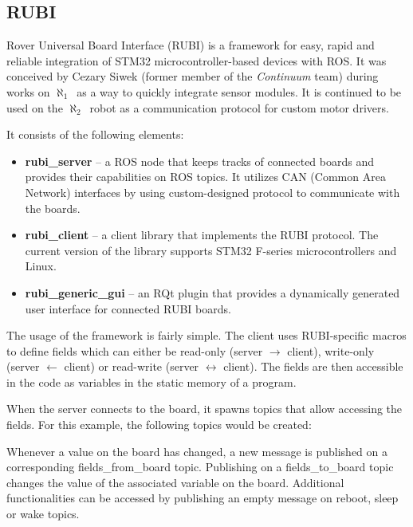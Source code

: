 \documentclass[english,inz,shortabstract]{iithesis}
\newcommand{\oldrovername}{$\aleph_1$\ }
\newcommand{\rovername}{$\aleph_2$\ }
\begin{document}
    \subsection{RUBI}
    Rover Universal Board Interface (RUBI) is a framework for easy, rapid and reliable integration of STM32 microcontroller-based devices with ROS. It was conceived by Cezary Siwek (former member of the \textit{Continuum} team) during works on \oldrovername as a way to quickly integrate sensor modules. It is continued to be used on the \rovername robot as a communication protocol for custom motor drivers.

    It consists of the following elements:
    \begin{itemize}
        \item \textbf{rubi\_server} -- a ROS node that keeps tracks of connected boards and provides their capabilities on ROS topics. It utilizes CAN (Common Area Network) interfaces by using custom-designed protocol to communicate with the boards.
        \item \textbf{rubi\_client} -- a client library that implements the RUBI protocol. The current version of the library supports STM32 F-series microcontrollers and Linux.
        \item \textbf{rubi\_generic\_gui} -- an RQt plugin that provides a dynamically generated user interface for connected RUBI boards.

    \end{itemize}

    The usage of the framework is fairly simple. The client uses RUBI-specific macros to define fields which can either be read-only (server $\rightarrow$ client), write-only (server $\leftarrow$ client) or read-write (server $\leftrightarrow$ client). The fields are then accessible in the code as variables in the static memory of a program.

    

    When the server connects to the board, it spawns topics that allow accessing the fields. For this example, the following topics would be created:

    

    Whenever a value on the board has changed, a new message is published on a corresponding \textsf{fields\_from\_board} topic. Publishing on a \textsf{fields\_to\_board} topic changes the value of the associated variable on the board. Additional functionalities can be accessed by publishing an empty message on \textsf{reboot}, \textsf{sleep} or \textsf{wake} topics.
\end{document}

